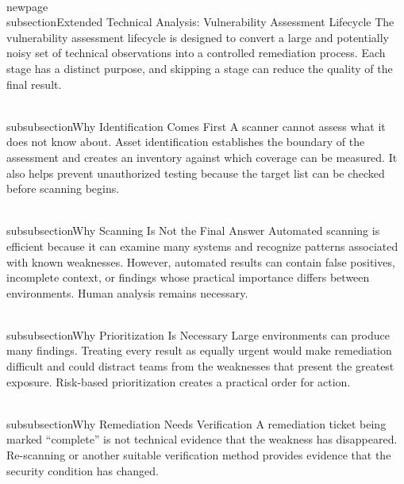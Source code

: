 \documentclass[11pt,a4paper]{article}
\begin{document}
\\newpage
\\subsection{Extended Technical Analysis: Vulnerability Assessment Lifecycle}
The vulnerability assessment lifecycle is designed to convert a large and potentially noisy set of technical observations into a controlled remediation process. Each stage has a distinct purpose, and skipping a stage can reduce the quality of the final result.

\\subsubsection{Why Identification Comes First}
A scanner cannot assess what it does not know about. Asset identification establishes the boundary of the assessment and creates an inventory against which coverage can be measured. It also helps prevent unauthorized testing because the target list can be checked before scanning begins.

\\subsubsection{Why Scanning Is Not the Final Answer}
Automated scanning is efficient because it can examine many systems and recognize patterns associated with known weaknesses. However, automated results can contain false positives, incomplete context, or findings whose practical importance differs between environments. Human analysis remains necessary.

\\subsubsection{Why Prioritization Is Necessary}
Large environments can produce many findings. Treating every result as equally urgent would make remediation difficult and could distract teams from the weaknesses that present the greatest exposure. Risk-based prioritization creates a practical order for action.

\\subsubsection{Why Remediation Needs Verification}
A remediation ticket being marked ``complete'' is not technical evidence that the weakness has disappeared. Re-scanning or another suitable verification method provides evidence that the security condition has changed.
\end{document}
